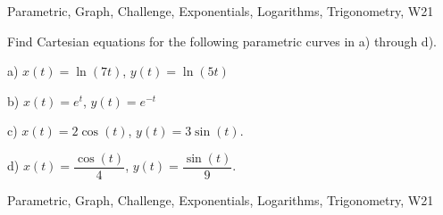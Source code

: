 \begin{tagblock}{Parametric, Graph, Challenge, Exponentials, Logarithms, Trigonometry, W21}
\begin{question}

Find Cartesian equations for the following parametric curves in a) through d). 

\bigskip

a) $x(t)= \ln(7t)$, $y(t)=\ln(5t)$

\bigskip

b) $x(t)= e^t$, $y(t)=e^{-t}$

\bigskip

c) $x(t)= 2\cos(t)$, $y(t)=3\sin(t)$.

\bigskip

d) $x(t)=\dfrac{\cos(t)}{4}$, $y(t)=\dfrac{\sin(t)}9$.
	
	
\begin{tags}
	    Parametric, Graph, Challenge, Exponentials, Logarithms, Trigonometry, W21
\end{tags}
	
\begin{diary}
\end{diary}
	
\begin{solution}
	   
\end{solution}
	
\end{question}

\end{tagblock}

